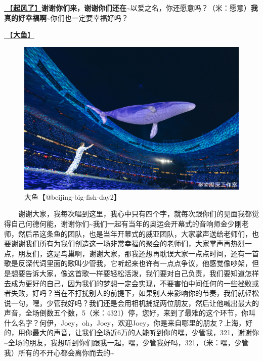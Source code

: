 \documentclass[]{ctexbook}
\begin{document}
\hyperref[the-wind-rises]{🎵【\textbf{起风了}】}\textbf{谢谢你们来，谢谢你们还在\textasciitilde{}}以爱之名，你还愿意吗？（米：愿意）\textbf{我真的好幸福啊\textasciitilde{}}你们也一定要幸福好吗？

\hyperref[big-fish]{🎵【\textbf{大鱼}】}

\begin{figure}

{\centering \includegraphics[width=400pt]{img/beijing20240922/big-fish} 

}

\caption{大鱼【@beijing-big-fish-day2】}\label{fig:unnamed-chunk-108}
\end{figure}

  谢谢大家，我每次唱到这里，我心中只有四个字，就每次跟你们的见面我都觉得自己何德何能，谢谢你们\textasciitilde 我们一起有当年的奥运会开幕式的音响师金少刚老师，然后吊这条鱼的团队，也是当年开幕式的威亚团队，大家掌声送给老师们，也要谢谢我们所有为我们创造这一场非常幸福的聚会的老师们，大家掌声再热烈一点，朋友们，这是鸟巢啊，谢谢大家，那我还想再耽误大家一点点时间，还有一首歌是反深代词里面的歌叫少管我，它听起来也许有一点点争议，他感觉像吵架，但是想要告诉大家，像这首歌一样要轻松活泼，我们要对自己负责，我们要知道怎样去成为更好的自己，因为我们的梦想一定会实现，不要害怕中间任何的一些挫败或者失败，好吗？当在不打扰别人的前提下，如果别人来影响你的节奏，我们就轻松说一句，嘿，少管我好吗？我们还是会用相机捕捉两位朋友，然后让他喊出最大的声音，全场倒数五个数，5（米：4321）停，您好，来到了最难的这个环节，你叫什么名字？何伊，Joey，oh，Joey，欢迎Joey，你是来自哪里的朋友？上海，好的，用你最大的声音，让我们全场近6万的人能听到你的嘿，少管我，321，谢谢你\textasciitilde 全场的朋友，我想听到你们跟我一起，嘿，少管我好吗，321，（米：嘿，少管我）所有的不开心都会离你而去的\textasciitilde{}
\end{document}
